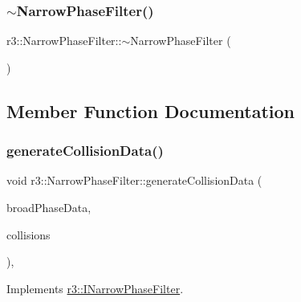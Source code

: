 \subsubsection{\texorpdfstring{$\sim$\+Narrow\+Phase\+Filter()}{~NarrowPhaseFilter()}}
{\footnotesize\ttfamily r3\+::\+Narrow\+Phase\+Filter\+::$\sim$\+Narrow\+Phase\+Filter (\begin{DoxyParamCaption}{ }\end{DoxyParamCaption})\hspace{0.3cm}{\ttfamily [default]}}



\subsection{Member Function Documentation}
\mbox{\label{classr3_1_1_narrow_phase_filter_a44da84d1dbc12e9f95af46aac270ebb8}} 
\subsubsection{\texorpdfstring{generate\+Collision\+Data()}{generateCollisionData()}\hspace{0.1cm}{\footnotesize\ttfamily [1/2]}}
{\footnotesize\ttfamily void r3\+::\+Narrow\+Phase\+Filter\+::generate\+Collision\+Data (\begin{DoxyParamCaption}\item[{const \mbox{\hyperlink{classr3_1_1_broad_phase_collision_data}{Broad\+Phase\+Collision\+Data}} \&}]{broad\+Phase\+Data,  }\item[{\mbox{\hyperlink{classr3_1_1_collision_data}{Collision\+Data}} \&}]{collisions }\end{DoxyParamCaption})\hspace{0.3cm}{\ttfamily [override]}, {\ttfamily [virtual]}}



Implements \mbox{\hyperlink{classr3_1_1_i_narrow_phase_filter_a32ae92d18c929adfc5af54449c069d3b}{r3\+::\+I\+Narrow\+Phase\+Filter}}.

\mbox{\label{classr3_1_1_narrow_phase_filter_a567743be66c7e8d118165ec92ed68cdf}} 
